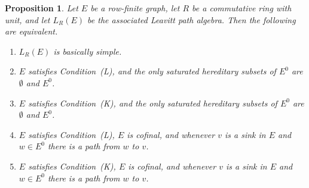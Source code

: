 \documentclass[11pt]{amsart}
\newtheorem{proposition}[theorem]{Proposition}
\theoremstyle{remark}
\numberwithin{equation}{section}
\begin{document}
\begin{proposition} \label{simple-equiv-prop}
Let $E$ be a row-finite graph, let $R$ be a commutative ring with unit, and let $L_R(E)$ be the associated Leavitt path algebra.  Then the following are equivalent.
\begin{enumerate}
\item $L_R(E)$ is basically simple.
\item $E$ satisfies Condition~(L), and the only saturated hereditary subsets of $E^0$ are $\emptyset$ and $E^0$.
\item $E$ satisfies Condition~(K), and the only saturated hereditary subsets of $E^0$ are $\emptyset$ and $E^0$.
\item $E$ satisfies Condition~(L), $E$ is cofinal, and whenever $v$ is a sink in $E$ and $w \in E^0$ there is a path from $w$ to $v$.
\item  $E$ satisfies Condition~(K), $E$ is cofinal, and whenever $v$ is a sink in $E$ and $w \in E^0$ there is a path from $w$ to $v$.
\end{enumerate}
\end{proposition}
\end{document}
